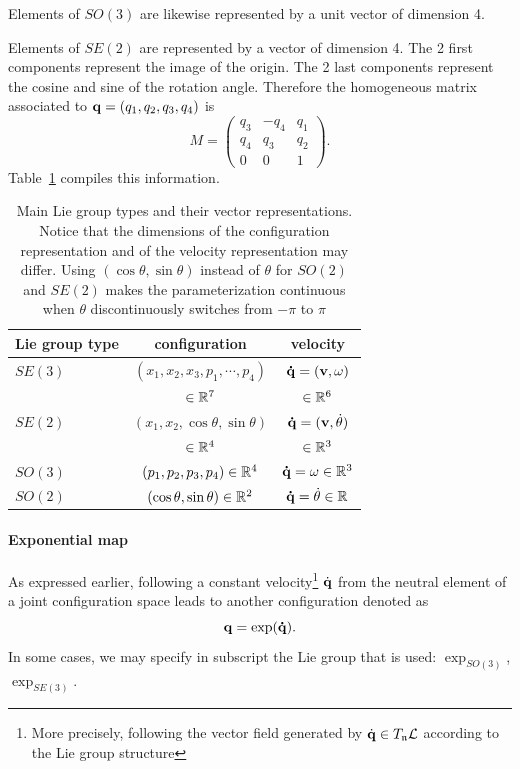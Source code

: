 Elements of $SO(3)$ are likewise represented by a unit vector of dimension 4.

Elements of $SE(2)$ are represented by a vector of dimension 4. The 2 first components represent the image of the origin. The 2 last components represent the cosine and sine of the rotation angle. Therefore the homogeneous matrix associated to $\mathbf{q}=(q_1,q_2,q_3,q_4)$ is
$$
M = \left(\begin{array}{lll}
  q_3 & -q_4 & q_1 \\
  q_4 &  q_3 & q_2 \\
  0   &  0  & 1
\end{array}\right).
$$
Table~\ref{tab:vector representation} compiles this information.
\begin{table}
  \begin{tabular}{|l|c|c|}
    \hline
    Lie group type & configuration & velocity\\
    \hline
    $SE(3)$ & $(x_1,x_2,x_3,p_1,\cdots,p_4)$ & $\mathbf{\dot{q}}=(\mathbf{v},\omega)$ \\
            & $\in\mathbb{R}^7$                 & $\in\mathbb{R}^6$ \\
    $SE(2)$ & $(x_1,x_2,\cos\theta,\sin\theta)$ & $\mathbf{\dot{q}}=(\mathbf{v},\dot{\theta})$\\
            & $\in\mathbb{R}^4$                 & $\in\mathbb{R}^3$ \\
    $SO(3)$ & $(p_1,p_2,p_3,p_4)\in\mathbb{R}^4$ & $\mathbf{\dot{q}}=\omega\in\mathbb{R}^3$\\
    $SO(2)$ & $(\cos\theta,\sin\theta)\in\mathbb{R}^2$ & $\mathbf{\dot{q}}=\dot{\theta}\in\mathbb{R}$\\
    \hline
  \end{tabular}
  \caption{Main Lie group types and their vector representations. Notice that the dimensions of the configuration representation and of the velocity representation may differ. {\color{blue} Using $(\cos\theta,\sin\theta)$ instead of $\theta$ for $SO(2)$ and $SE(2)$ makes the parameterization continuous when $\theta$ discontinuously switches from $-\pi$ to $\pi$}}
  \label{tab:vector representation}
\end{table}

\paragraph{Exponential map}

As expressed earlier, following a constant velocity\footnote{More precisely, following the vector field generated by $\dot{\mathbf{q}}\in T_{\mathfrak{n}}\mathcal{L}$ according to the Lie group structure} $\dot{\mathbf{q}}$ from the neutral element of a joint configuration space leads to another configuration denoted as
$$
\mathbf{q} = \exp(\mathbf{\dot{q}}).
$$
In some cases, we may specify in subscript the Lie group that is used: \href{https://github.com/stack-of-tasks/pinocchio/blob/f8f3b9a24eab527df79650e3dc73410f9a46a2b2/src/spatial/explog.hpp\#L34}{$\exp_{SO(3)}$}, \href{https://github.com/stack-of-tasks/pinocchio/blob/f8f3b9a24eab527df79650e3dc73410f9a46a2b2/src/spatial/explog.hpp\#L236}{$\exp_{SE(3)}$}.

